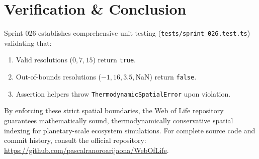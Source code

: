 \documentclass[11pt, a4paper]{article}
\begin{document}
\section{Verification \& Conclusion}
Sprint 026 establishes comprehensive unit testing (\texttt{tests/sprint\_026.test.ts}) validating that:
\begin{enumerate}
    \item Valid resolutions ($0, 7, 15$) return \texttt{true}.
    \item Out-of-bounds resolutions ($-1, 16, 3.5, \text{NaN}$) return \texttt{false}.
    \item Assertion helpers throw \texttt{ThermodynamicSpatialError} upon violation.
\end{enumerate}

By enforcing these strict spatial boundaries, the Web of Life repository guarantees mathematically sound, thermodynamically conservative spatial indexing for planetary-scale ecosystem simulations. For complete source code and commit history, consult the official repository: \url{https://github.com/pascalranoroarijaona/WebOfLife}.
\end{document}
